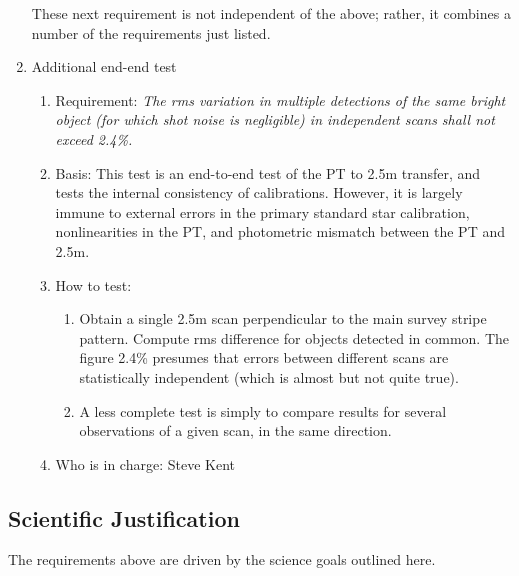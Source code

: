 \begin{enumerate}
These next requirement is not independent of the above; rather,
it combines a number of the requirements just listed.

\item Additional end-end test
   \begin{enumerate}
   \item Requirement: {\it The rms variation in multiple detections of
the same bright object (for which shot noise is negligible) in
independent scans shall not exceed 2.4\%.} 
   \item Basis:  This test is an end-to-end test of the PT to 2.5m
	transfer, and tests the internal consistency of calibrations.
	However, it is
	largely immune to external errors in the primary standard star
calibration, nonlinearities in the PT, and photometric mismatch
between the PT and 2.5m. 
   \item How to test:
	\begin{enumerate}
	\item Obtain a single 2.5m scan perpendicular to the main survey
	   stripe pattern.  Compute rms difference for objects detected in
	   common.  The figure 2.4\% presumes that errors between different
	   scans are statistically independent (which is almost but not
	   quite true).
	\item A less complete test is simply to compare results for
	several observations of a given scan, in the same direction. 
	\end{enumerate}
   \item Who is in charge: Steve Kent
   \end{enumerate}

\end{enumerate}

\subsection{Scientific Justification}
The requirements above are driven by the science goals outlined here. 

